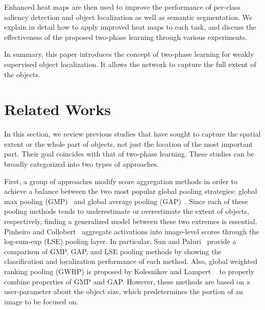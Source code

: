 \documentclass[10pt,twocolumn,letterpaper]{article}
\begin{document}
Enhanced heat maps are then used to improve the performance of per-class saliency detection and object localization as well as semantic segmentation. We explain in detail how to apply improved heat maps to each task, and discuss the effectiveness of the proposed two-phase learning through various experiments.

In summary, this paper introduces the concept of two-phase learning for weakly supervised object localization. It allows the network to capture the full extent of the objects.

\section{Related Works}
\label{sec:related_work}
In this section, we review previous studies that have sought to capture the spatial extent or the whole part of objects, not just the location of the most important part. Their goal coincides with that of two-phase learning. These studies can be broadly categorized into two types of approaches.

First, a group of approaches modify score aggregation methods in order to achieve a balance between the two most popular global pooling strategies: global max pooling (GMP)~\cite{Oquab15} and global average pooling (GAP)~\cite{zhou2016cvpr}. Since each of these pooling methods tends to underestimate or overestimate the extent of objects, respectively, finding a generalized model between these two extremes is essential.
Pinheiro and Collobert~\cite{Pinheiro2015CVPR} aggregate activations into image-level scores through the log-sum-exp (LSE) pooling layer. In particular, Sun and Paluri~\cite{SunPCNB16pro} provide a comparison of GMP, GAP, and LSE pooling methods by showing the classification and localization performance of each method. Also, global weighted ranking pooling (GWRP) is proposed by Kolesnikov and Lampert ~\cite{kolesnikov2016seed} to properly combine properties of GMP and GAP. However, these methods are based on a user-parameter about the object size, which predetermines the portion of an image to be focused on.
\end{document}
